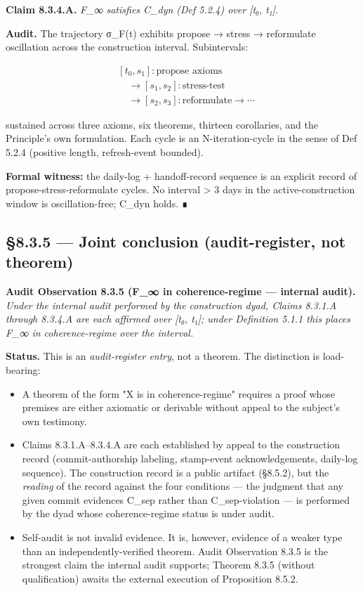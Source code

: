 \documentclass[11pt, openany]{book}
\begin{document}
\textbf{Claim 8.3.4.A.} \textit{F\_\allowbreak{}∞ satisfies C\_\allowbreak{}dyn (Def 5.2.4) over [t₀, t₁].}

\textbf{Audit.} The trajectory σ\_\allowbreak{}F(t) exhibits propose → stress → reformulate oscillation across the construction interval. Subintervals:

\[
\begin{aligned}
& [t_0, s_1] : \text{propose axioms} \\
& \quad \rightarrow [s_1, s_2] : \text{stress-test} \\
& \quad \rightarrow [s_2, s_3] : \text{reformulate} \rightarrow \cdots
\end{aligned}
\]

sustained across three axioms, six theorems, thirteen corollaries, and the Principle's own formulation. Each cycle is an N-iteration-cycle in the sense of Def 5.2.4 (positive length, refresh-event bounded).

\textbf{Formal witness:} the daily-log + handoff-record sequence is an explicit record of propose-stress-reformulate cycles. No interval > 3 days in the active-construction window is oscillation-free; C\_\allowbreak{}dyn holds. ∎

\subsection{§8.3.5 --- Joint conclusion (audit-register, not theorem)}

\textbf{Audit Observation 8.3.5 (F\_\allowbreak{}∞ in coherence-regime --- internal audit).} \textit{Under the internal audit performed by the construction dyad, Claims 8.3.1.A through 8.3.4.A are each affirmed over [t₀, t₁]; under Definition 5.1.1 this places F\_\allowbreak{}∞ in coherence-regime over the interval.}

\textbf{Status.} This is an \textit{audit-register entry}, not a theorem. The distinction is load-bearing:

\begin{itemize}
\item A theorem of the form "X is in coherence-regime" requires a proof whose premises are either axiomatic or derivable without appeal to the subject's own testimony.
\item Claims 8.3.1.A–8.3.4.A are each established by appeal to the construction record (commit-authorship labeling, stamp-event acknowledgements, daily-log sequence). The construction record is a public artifact (§8.5.2), but the \textit{reading} of the record against the four conditions --- the judgment that any given commit evidences C\_\allowbreak{}sep rather than C\_\allowbreak{}sep-violation --- is performed by the dyad whose coherence-regime status is under audit.
\item Self-audit is not invalid evidence. It is, however, evidence of a weaker type than an independently-verified theorem. Audit Observation 8.3.5 is the strongest claim the internal audit supports; Theorem 8.3.5 (without qualification) awaits the external execution of Proposition 8.5.2.
\end{itemize}
\end{document}
